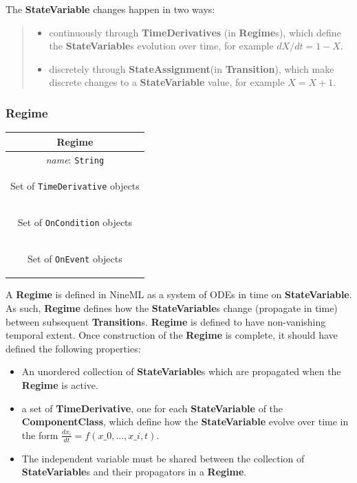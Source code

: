 \documentclass{article}
\newcommand{\nmlClass}[1]{{\bf #1}}
\newcommand{\ComponentClass}{{\bf{ComponentClass}}\xspace}
\newcommand{\StateVariable}{{\bf{StateVariable}}\xspace}
\newcommand{\StateVariables}{{\bf{StateVariable}}s\xspace}
\newcommand{\StateAssignment}{{\bf{StateAssignment}}\xspace}
\newcommand{\TimeDerivative}{{\bf{TimeDerivative}}\xspace}
\newcommand{\Regime}{{\bf{Regime}}\xspace}
\newcommand{\Regimes}{{\bf{Regime}}s\xspace}
\newcommand{\Transition}{{\bf{Transition}}\xspace}
\newcommand{\Transitions}{{\bf{Transition}}s\xspace}
\begin{document}
The \StateVariable changes happen in two ways:
%
\begin{quote}
\begin{itemize}
\item continuously through \textbf{TimeDerivatives} (in \Regimes),
which define the \StateVariables evolution over time, for example
$dX/dt=1-X$.
\item discretely through \StateAssignment (in \Transition),
which make discrete changes to a \StateVariable value, for example
$X = X + 1$.
\end{itemize}
\end{quote}

\subsubsection{Regime}
\label{regime}


\begin{table}[htb]
\center
\begin{tabular}{|c|}
\hline
\hline
Regime \\
\hline
\hline
{\em name}: {\tt String} \\
\hline
\colorbox{issuecolor}{\parbox{0.4\linewidth}
{\center Set of {\tt TimeDerivative} objects}} \\
\hline
\colorbox{issuecolor}{\parbox{0.4\linewidth}
{\center Set of {\tt OnCondition} objects}} \\
\hline
\colorbox{issuecolor}{\parbox{0.4\linewidth}
{\center Set of {\tt OnEvent} objects}} \\
\hline
\end{tabular}
\end{table}


A \Regime is defined in NineML as a system of ODEs in time
on \StateVariable.  As such, \Regime defines how the \StateVariables
change (propagate in time) between subsequent \Transitions. \Regime is
defined to have non-vanishing temporal extent. Once construction of
the \Regime is complete, it should have defined the following
properties:

\begin{itemize}
\item An unordered collection of \nmlClass{StateVariable}s which are
propagated when the \nmlClass{Regime} is active.
\item a set of \TimeDerivative, one for each \StateVariable
of the \ComponentClass, which define how the \StateVariable
evolve over time in the form $\frac{dx_{i}}{dt} = f(x\_0, ..., x\_i, t)$.
\item The independent variable must be shared between the collection
of \nmlClass{StateVariable}s and their propagators in a \Regime.
\end{itemize}
\end{document}
